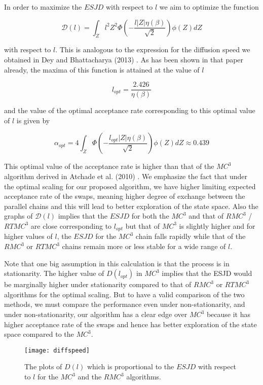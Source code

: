 \documentclass[11pt]{article}
\renewcommand{\b}{\ensuremath{\beta}}
\begin{document}
In order to maximize the $ESJD$ with respect to $l$ we aim to optimize the function 

\[ \mathcal{D}(l) = \int_{Z} {l^2 Z^2 \Phi \left (-\frac{l|Z| \eta(\b)}{\sqrt{2}} \right ) \phi(Z)} dZ \]


with respect to $l$. This is analogous to the expression for the diffusion speed we obtained in Dey and Bhattacharya (2013)  \cite{Dey2013}. As has been shown in that paper already, the maxima of this function is attained at the value of $l$ 

\[  l_{opt} = \frac{2.426}{\eta(\b)} \]

and the value of the optimal acceptance rate corresponding to this optimal value of $l$ is given by 

\[ \alpha_{opt} = 4 \int_{Z} \Phi \left (-\frac{l_{opt}|Z|\eta(\b)}{\sqrt{2}} \right) \phi(Z) dZ  \approx 0.439 \]


This optimal value of the acceptance rate is higher than that of the $MC^{3}$ algorithm derived in Atchade et al. (2010) \cite{Atchade2010}. We emphasize the fact that under the optimal scaling for our proposed algorithm, we have higher limiting expected acceptance rate of the swaps, meaning higher degree of exchange between the parallel chains and this will lead to better exploration of the state space. Also the graphs of $\mathcal{D}(l)$ implies that the $ESJD$ for both the $MC^3$ and that of $RMC^3$ / $RTMC^3$ are close corresponding to $l_{opt}$ but that of $MC^{3}$ is slightly higher and for higher values of $l$, the $ESJD$ for the $MC^3$ chain falls rapidly while that of the $RMC^3$ or $RTMC^3$ chains remain more or less stable for a wide range of $l$. 

Note that one big assumption in this calculation is that the process is in stationarity. The higher value of $D(l_{opt})$ in $MC^3$ implies that the ESJD would be marginally higher under stationarity compared to that of $RMC^3$ or $RTMC^3$ algorithms for the optimal scaling. But to have a valid comparison of the two methods, we must compare the performance even under non-stationarity, and under non-stationarity, our algorithm has a clear edge over $MC^3$ because it has higher acceptance rate of the swaps and hence has better exploration of the state space compared to the $MC^3$. 

\begin{figure}  \centering \texttt{[image: diffspeed]}  
\caption{The plots of $D(l)$ which is proportional to the $ESJD$ with respect to $l$ for the $MC^3$ and the $RMC^3$ algorithms.} \label{fig:fig4} \end{figure}
\end{document}
